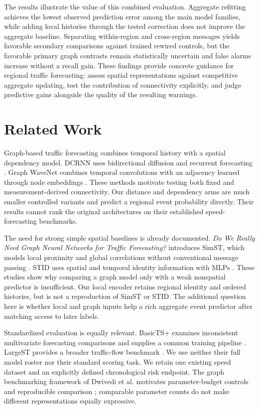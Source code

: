 \documentclass{llncs}
\begin{document}
The results illustrate the value of this combined evaluation. Aggregate refitting achieves the lowest observed prediction error among the main model families, while adding local histories through the tested correction does not improve the aggregate baseline. Separating within-region and cross-region messages yields favorable secondary comparisons against trained rewired controls, but the favorable primary graph contrasts remain statistically uncertain and false alarms increase without a recall gain. These findings provide concrete guidance for regional traffic forecasting: assess spatial representations against competitive aggregate updating, test the contribution of connectivity explicitly, and judge predictive gains alongside the quality of the resulting warnings.









\section{Related Work}
Graph-based traffic forecasting combines temporal history with a spatial dependency model. DCRNN uses bidirectional diffusion and recurrent forecasting \cite{dcrnn}. Graph WaveNet combines temporal convolutions with an adjacency learned through node embeddings \cite{gwnet}. These methods motivate testing both fixed and measurement-derived connectivity. Our distance and dependency arms are much smaller controlled variants and predict a regional event probability directly. Their results cannot rank the original architectures on their established speed-forecasting benchmarks.

The need for strong simple spatial baselines is already documented. \emph{Do We Really Need Graph Neural Networks for Traffic Forecasting?} introduces SimST, which models local proximity and global correlations without conventional message passing \cite{simst}. STID uses spatial and temporal identity information with MLPs \cite{stid}. These studies show why comparing a graph model only with a weak nonspatial predictor is insufficient. Our local encoder retains regional identity and ordered histories, but is not a reproduction of SimST or STID. The additional question here is whether local and graph inputs help a rich aggregate event predictor after matching access to later labels.

Standardized evaluation is equally relevant. BasicTS+ examines inconsistent multivariate forecasting comparisons and supplies a common training pipeline \cite{basicts}. LargeST provides a broader traffic-flow benchmark \cite{largest}. We use neither their full model roster nor their standard scoring task. We retain one existing speed dataset and an explicitly defined chronological risk endpoint. The graph benchmarking framework of Dwivedi et al. motivates parameter-budget controls and reproducible comparison \cite{benchmark}; comparable parameter counts do not make different representations equally expressive.
\end{document}
